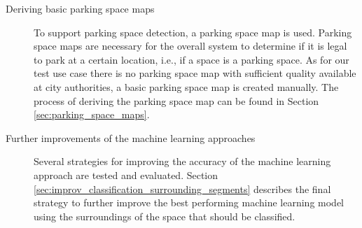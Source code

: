 \begin{description}
\item[Deriving basic parking space maps] To support parking space detection, a parking space map is used. Parking space maps are necessary for the overall system to determine if it is legal to park at a certain location, i.e., if a space is a parking space. As for our test use case there is no parking space map with sufficient quality available at city authorities, a basic parking space map is created manually. The process of deriving the parking space map can be found in Section \ref{sec:parking_space_maps}.

\item[Further improvements of the machine learning approaches] Several strategies for improving the accuracy of the machine learning approach are tested and evaluated. Section \ref{sec:improv_classification_surrounding_segments} describes the final strategy to further improve the best performing machine learning model using the surroundings of the space that should be classified.


\end{description}




